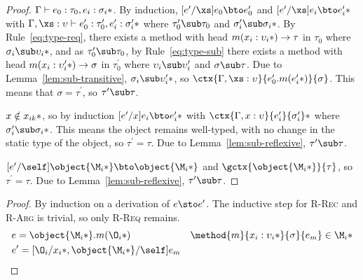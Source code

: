 \begin{theorem}[Preservation]
\begin{lemma}
\begin{proof}
      $\Gamma \vdash e_0 : \tau_0, \*e_i : \sigma_i*$.  By induction,
      $[e^\prime/\xs]e_0 \bto e^\prime_0$ and $\*[e^\prime/\xs]e_i \bto
      e^\prime_i*$ with $\Gamma, \xs : \upsilon \vdash e^\prime_0 :
      \tau_0^\prime, \*e^\prime_i : \sigma_i^\prime*$ where $\tau_0^\prime \sub
      \tau_0$ and $\*\sigma_i^\prime \sub \sigma_i*$.  By
      Rule~\ref{eq:type-req}, there exists a method with head $m(\*x_i :
      \upsilon_i*) \to \tau$ in $\tau_0$ where $\*\sigma_i \sub \upsilon_i*$,
      and as $\tau_0^\prime \sub \tau_0$, by Rule~\ref{eq:type-sub} there exists
      a method with head $m(\*x_i : \upsilon_i^\prime*) \to \sigma$ in
      $\tau_0^\prime$ where $\upsilon_i \sub \upsilon_i^\prime$ and
      $\sigma \sub \tau$.  Due to Lemma~\ref{lem:sub-transitive}, $\*\sigma_i
      \sub \upsilon_i^\prime*$, so $\ctx{\Gamma, \xs :
      \upsilon}{e_0^\prime.m(\*e_i^\prime*)}{\sigma}$.  This means that $\sigma
      = \tau^\prime$, so $\tau^\prime \sub \tau$.

      $x \notin \*x_{ik}*$, so by induction $\*[e^\prime/x]e_i \bto e_i^\prime*$
      with $\*\ctx{\Gamma, x : \upsilon}{e_i^\prime}{\sigma_i^\prime}*$ where
      $\*\sigma_i^\prime \sub \sigma_i*$.  This means the object remains
      well-typed, with no change in the static type of the object, so
      $\tau^\prime = \tau$.  Due to Lemma~\ref{lem:sub-reflexive}, $\tau^\prime
      \sub \tau$.

      $[e^\prime/\self]\object{\*\M_i*} \bto \object{\*\M_i*}$ and
      $\gctx{\object{\*\M_i*}}{\tau}$, so $\tau^\prime = \tau$.  Due to
      Lemma~\ref{lem:sub-reflexive}, $\tau^\prime \sub \tau$.
    \end{proof}
  \end{lemma}

  \begin{proof}
    By induction on a derivation of $e \sto e^\prime$.  The inductive step for
    \textsc{R-Rec} and \textsc{R-Arg} is trivial, so only \textsc{R-Req}
    remains.
%
    \begin{align*}
      &e = \object{\*\M_i*}.m(\*\O_i*) &
      \method{m}{\*x_i : \upsilon_i*}{\sigma}{e_m} \in \*\M_i* \\
      &e^\prime = [\*\O_i/x_i*, \object{\*\M_i*}/\self]e_m &
    \end{align*}


\end{proof}
\end{theorem}
